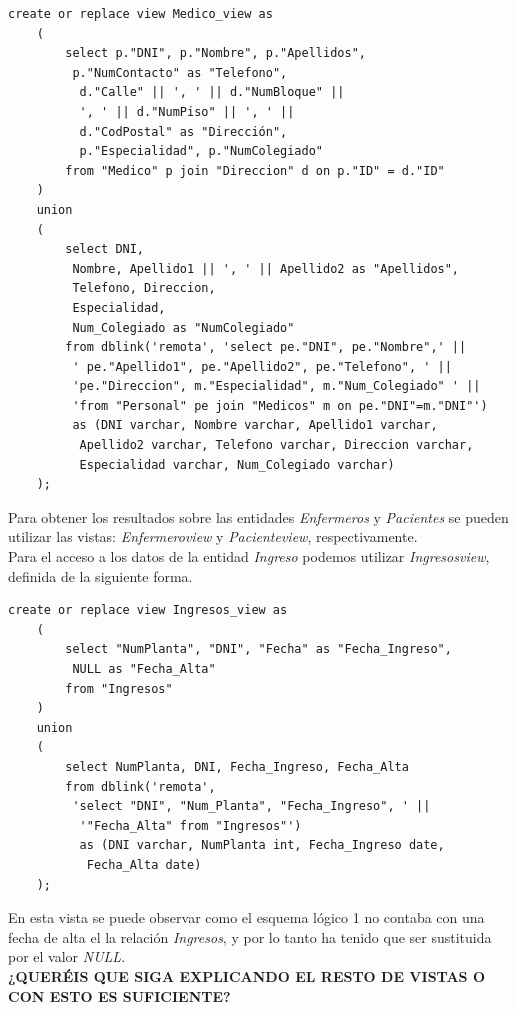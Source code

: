 \documentclass{article}
\begin{document}
\begin{lstlisting}
create or replace view Medico_view as
    (
        select p."DNI", p."Nombre", p."Apellidos",
         p."NumContacto" as "Telefono",
          d."Calle" || ', ' || d."NumBloque" ||
          ', ' || d."NumPiso" || ', ' ||
          d."CodPostal" as "Dirección",
          p."Especialidad", p."NumColegiado"
        from "Medico" p join "Direccion" d on p."ID" = d."ID"
    )
    union
    (
        select DNI,
         Nombre, Apellido1 || ', ' || Apellido2 as "Apellidos",
         Telefono, Direccion,
         Especialidad,
         Num_Colegiado as "NumColegiado"
		from dblink('remota', 'select pe."DNI", pe."Nombre",' ||
		 ' pe."Apellido1", pe."Apellido2", pe."Telefono", ' ||
		 'pe."Direccion", m."Especialidad", m."Num_Colegiado" ' ||
		 'from "Personal" pe join "Medicos" m on pe."DNI"=m."DNI"') 
		 as (DNI varchar, Nombre varchar, Apellido1 varchar,
		  Apellido2 varchar, Telefono varchar, Direccion varchar,
		  Especialidad varchar, Num_Colegiado varchar)
    );
\end{lstlisting}


Para obtener los resultados sobre las entidades \emph{Enfermeros} y \emph{Pacientes} se pueden utilizar las vistas: \emph{Enfermeroview} y \emph{Pacienteview}, respectivamente.\\
Para el acceso a los datos de la entidad \emph{Ingreso} podemos utilizar \emph{Ingresosview}, definida de la siguiente forma.\\

\begin{lstlisting}
create or replace view Ingresos_view as
    (
        select "NumPlanta", "DNI", "Fecha" as "Fecha_Ingreso", 
         NULL as "Fecha_Alta"
        from "Ingresos"
    )
    union
    (
        select NumPlanta, DNI, Fecha_Ingreso, Fecha_Alta
        from dblink('remota', 
         'select "DNI", "Num_Planta", "Fecha_Ingreso", ' || 
          '"Fecha_Alta" from "Ingresos"') 
          as (DNI varchar, NumPlanta int, Fecha_Ingreso date,
           Fecha_Alta date)
    );
\end{lstlisting}

En esta vista se puede observar como el esquema lógico 1 no contaba con una fecha de alta el la relación \emph{Ingresos}, y por lo tanto ha tenido que ser sustituida por el valor \emph{NULL}.\\

\textbf{{\LARGE ¿QUERÉIS QUE SIGA EXPLICANDO EL RESTO DE VISTAS O CON ESTO ES SUFICIENTE?}}
\end{document}
